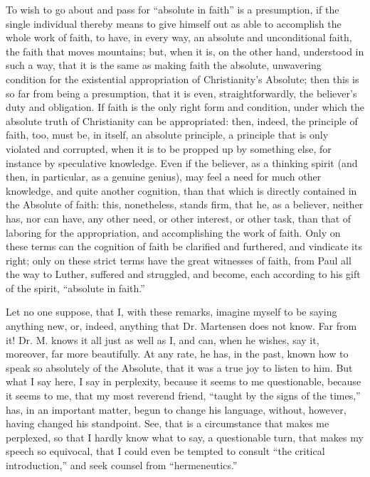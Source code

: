 \documentclass[12pt]{book}
\begin{document}
To wish to go about and pass for ``absolute in faith'' is a presumption, if the single individual thereby means to give himself out as able to accomplish the whole work of faith, to have, in every way, an absolute and unconditional faith, the faith that moves mountains; but, when it is, on the other hand, understood in such a way, that it is the same as making faith the absolute, unwavering condition for the existential appropriation of Christianity's Absolute; then this is so far from being a presumption, that it is even, straightforwardly, the believer's duty and obligation. If faith is the only right form and condition, under which the absolute truth of Christianity can be appropriated: then, indeed, the principle of faith, too, must be, in itself, an absolute principle, a principle that is only violated and corrupted, when it is to be propped up by something else, for instance by speculative knowledge. Even if the believer, as a thinking spirit (and then, in particular, as a genuine genius), may feel a need for much other knowledge, and quite another cognition,
than that which is directly contained in the Absolute of faith: this, nonetheless, stands firm, that he, as a believer, neither has, nor can have, any other need, or other interest, or other task, than that of laboring for the appropriation, and accomplishing the work of faith. Only on these terms can the cognition of faith be clarified and furthered, and vindicate its right; only on these strict terms have the great witnesses of faith, from Paul all the way to Luther, suffered and struggled, and become, each according to his gift of the spirit, ``absolute in faith.''

Let no one suppose, that I, with these remarks, imagine myself to be saying anything new, or, indeed, anything that Dr. Martensen does not know. Far from it! Dr. M. knows it all just as well as I, and can, when he wishes, say it, moreover, far more beautifully. At any rate, he has, in the past, known how to speak so absolutely of the Absolute, that it was a true joy to listen to him. But what I say here, I say in perplexity, because it seems to me questionable, because it seems to me, that my most reverend friend, ``taught by the signs of the times,'' has, in an important matter, begun to change his language, without, however, having changed his standpoint. See, that is a circumstance that makes me perplexed, so that I hardly know what to say, a questionable turn, that makes my speech so equivocal, that I could even be tempted to consult ``the critical introduction,'' and seek counsel from ``hermeneutics.''
\end{document}
